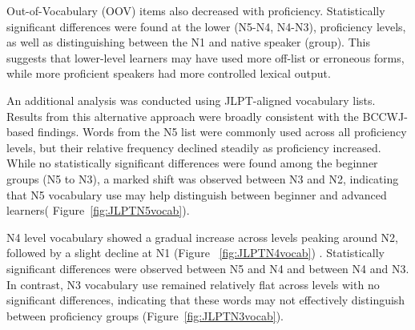Out-of-Vocabulary (OOV) items also decreased with proficiency. Statistically significant
differences were found at the lower (N5-N4,
N4-N3),
 proficiency levels, as well as distinguishing between the N1 and native speaker (group). This
suggests that lower-level learners
may
have used more off-list or erroneous forms, while more proficient speakers
had more controlled lexical output.








An additional analysis was conducted using JLPT-aligned vocabulary lists. Results from this alternative
approach were broadly consistent with the BCCWJ-based findings. Words from the
N5 list were commonly used across all proficiency levels, but their relative frequency declined steadily as
proficiency increased.
While no statistically significant differences were found among the beginner groups (N5 to N3), a marked shift
was observed between
N3 and N2, indicating that N5 vocabulary use may help distinguish between beginner and advanced learners(
Figure~\ref{fig:JLPTN5vocab}).

N4 level vocabulary showed a gradual increase across levels peaking around N2, followed by a slight decline 
at N1 (Figure~
\ref{fig:JLPTN4vocab})
. Statistically significant
differences were observed between N5 and N4 and
between N4 and N3. In contrast, N3 vocabulary use remained relatively flat across levels with no 
significant 
differences,
indicating that these words may not effectively distinguish between proficiency groups (Figure~\ref{fig:JLPTN3vocab}).

